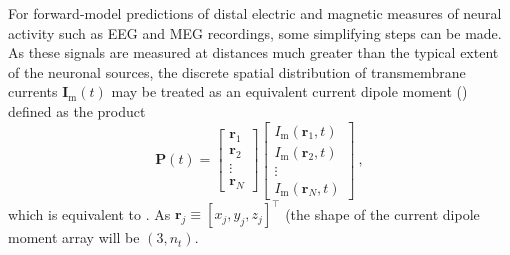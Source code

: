 For forward-model predictions of distal electric and magnetic measures of neural activity such as EEG and MEG recordings, 
some simplifying steps can be made. 
As these signals are measured at distances much greater than the typical extent of the neuronal sources, 
the discrete spatial distribution of transmembrane currents $\mathbf{I}_\mathrm{m}(t)$ may be 
treated as an equivalent current dipole moment () defined as the product
\begin{equation}
\mathbf{P}(t) = 
\begin{bmatrix}
\mathbf{r}_1 \\
\mathbf{r}_2 \\
\vdots \\
\mathbf{r}_N
\end{bmatrix}
\begin{bmatrix}
I_\mathrm{m}(\mathbf{r}_1, t) \\
I_\mathrm{m}(\mathbf{r}_2, t) \\
\vdots \\
I_\mathrm{m}(\mathbf{r}_N, t)
\end{bmatrix} ~, 
\end{equation}
which is equivalent to . 
As $\mathbf{r}_j \equiv [x_j, y_j, z_j]^\top$ (the shape of the current dipole moment array will be $(3, n_t)$. 

